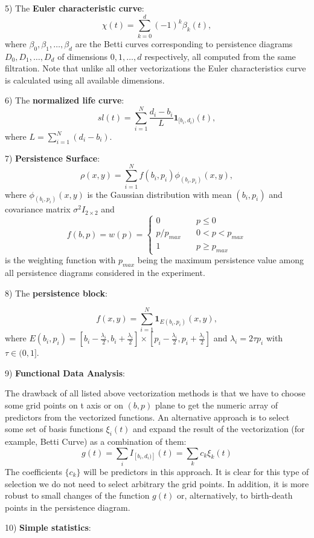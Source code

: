 \documentclass[conference, onecolumn]{IEEEtran}
\begin{document}
5) The \textbf{Euler characteristic curve}: 
$$
\chi(t)=\sum_{k=0}^d (-1)^k\beta_k(t),
$$ where $\beta_0,\beta_1,\ldots,\beta_d$ are the Betti curves corresponding to persistence diagrams $D_0,D_1,\ldots,D_d$ of dimensions $0,1,\ldots,d$ respectively, all computed from the same filtration. Note that unlike all other vectorizations the Euler characteristics curve is calculated using all available dimensions.

6) The \textbf{normalized life curve}: 
$$
sl(t)=\sum_{i=1}^N \frac{d_i-b_i}{L}\mathbf{1}_{[b_i,d_i)}(t),
$$ where $L=\sum_{i=1}^N (d_i-b_i)$.

7) \textbf{Persistence Surface}:
$$\rho(x,y)=\sum_{i=1}^N f(b_i,p_i)\phi_{(b_i,p_i)}(x,y),$$ where $\phi_{(b_i,p_i)}(x,y)$ is 
the Gaussian distribution with mean $(b_i,p_i)$ and 
covariance matrix $\sigma^2 I_{2\times 2}$ and 
$$
f(b,p) = w(p)=\left\{
        \begin{array}{ll}
            0 & \quad p\leq 0 \\
            p/p_{max} & \quad 0<p<p_{max}\\
            1& \quad p\geq p_{max}
        \end{array}
    \right.
$$
is the weighting function with $p_{max}$ being the maximum persistence value among all persistence diagrams considered in the experiment.

8) The \textbf{persistence block}:

$$
f(x,y)=\sum_{i=1}^N \mathbf 1_{E(b_i,p_i)}(x,y),
$$
where $E(b_i,p_i)=[b_i-\frac{\lambda_i}{2},b_i+\frac{\lambda_i}{2}]\times [p_i-\frac{\lambda_i}{2},p_i+\frac{\lambda_i}{2}]$ and $\lambda_i=2\tau p_i$ with $\tau\in (0,1]$.

9) \textbf{Functional Data Analysis}:

The drawback of all listed above vectorization methods is that we have to choose some grid points on t axis or on $(b,p)$ plane to get the numeric array of predictors from the vectorized functions. An alternative approach is to select some set of basis functions $\xi_i(t)$ and expand the result of the vectorization (for example, Betti Curve) as a combination of them:
$$
g(t) = \sum_i I_{[b_i,d_i)]}(t) = \sum_k c_k \xi_k(t)
$$
The coefficients $\{c_k\}$ will be predictors in this approach. It is clear for this type of selection we do not need to select arbitrary the grid points. In addition, it is more robust to small changes of the function $g(t)$ or, alternatively, to birth-death points in the persistence diagram.

10) \textbf{Simple statistics}:
\end{document}
